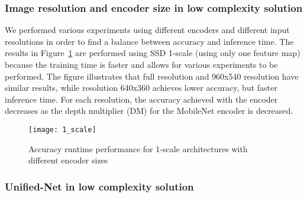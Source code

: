 \documentclass[10pt,twocolumn,letterpaper]{article}
\begin{document}
\subsubsection{Image resolution and encoder size in low complexity solution}
We performed various experiments using different encoders and different input resolutions in order to find a balance between accuracy and inference time. The results in Figure~\ref{fig:1_scale}  are performed using SSD 1-scale (using only one feature map) because the training time is faster and allows for various experiments to be performed. The figure illustrates that full resolution and 960x540 resolution have similar results, while resolution 640x360 achieves lower accuracy, but faster inference time. For each resolution, the accuracy achieved with the encoder decreases as the depth multiplier (DM) for the MobileNet encoder is decreased.
\begin{figure}[t]
\begin{center}
\texttt{[image: 1\_scale]}
\end{center}
   \caption{Accuracy \vs runtime performance for 1-scale architectures with different encoder sizes}
\label{fig:1_scale}
\end{figure}




\subsubsection{Unified-Net in low complexity solution}
\begin{table}
\begin{center}
\begin{threeparttable}

    \end{threeparttable}
\end{center}
\caption{Unified-Net results for various branching layers}
\label{branching_results}
\end{table}
\end{document}
